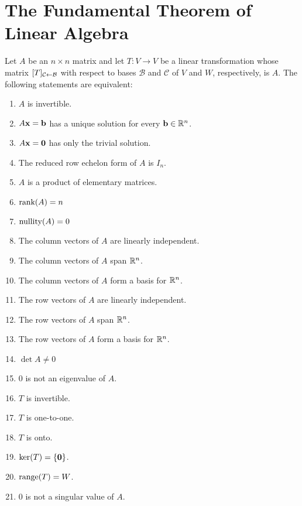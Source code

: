 \documentclass[../m73main.tex]{subfiles}
\begin{document}
\appendix\chapter{The Fundamental Theorem of Linear Algebra}

Let $A$ be an $n\times n$ matrix and let $T : V \to V$ be a linear transformation whose matrix $[T]_{\mathcal{C} \leftarrow \mathcal{B}}$ with respect to bases $\mathcal{B}$ and $\mathcal{C}$ of $V$ and $W$, respectively, is $A$.
The following statements are equivalent: 
\begin{enumerate}[label=(\alph*)]	
	\item $A$ is invertible.
	\item $A\mathbf{x} = \mathbf{b}$ has a unique solution for every $\mathbf{b} \in \mathbb{R}^n$.
	\item $A\mathbf{x} = \mathbf{0}$ has only the trivial solution.
	\item The reduced row echelon form of $A$ is $I_n$.
	\item $A$ is a product of elementary matrices.
	\item $\textrm{rank}(A) = n$
	\item $\textrm{nullity}(A) = 0$
	\item The column vectors of $A$ are linearly independent.
	\item The column vectors of $A$ span $\mathbb{R}^n$.
	\item The column vectors of $A$ form a basis for $\mathbb{R}^n$.
	\item The row vectors of $A$ are linearly independent.
	\item The row vectors of $A$ span $\mathbb{R}^n$.
	\item The row vectors of $A$ form a basis for $\mathbb{R}^n$.
	\item $\det A \neq 0$
	\item 0 is not an eigenvalue of $A$.
	\item $T$ is invertible.
	\item $T$ is one-to-one.
	\item $T$ is onto.
	\item $\textrm{ker}(T) = \{\mathbf{0}\}$.
	\item $\textrm{range}(T) = W$.
	\item 0 is not a singular value of $A$.
\end{enumerate}
\end{document}
